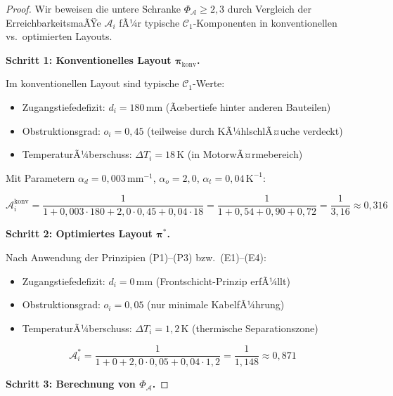 ﻿\documentclass[12pt,a4paper]{article}
\begin{document}
\begin{proof}
Wir beweisen die untere Schranke $\Phi_\mathcal{A} \geq 2{,}3$ durch Vergleich
der ErreichbarkeitsmaÃŸe $\mathcal{A}_i$ fÃ¼r typische $\mathcal{C}_1$-Komponenten
in konventionellen vs.\ optimierten Layouts.

\textbf{Schritt 1: Konventionelles Layout $\boldsymbol{\pi}_\mathrm{konv}$.}

Im konventionellen Layout sind typische $\mathcal{C}_1$-Werte:
\begin{itemize}[leftmargin=*]
	\item Zugangstiefedefizit: $d_i = 180\,\mathrm{mm}$ (Ãœbertiefe hinter anderen
	Bauteilen)
	\item Obstruktionsgrad: $o_i = 0{,}45$ (teilweise durch KÃ¼hlschlÃ¤uche verdeckt)
	\item TemperaturÃ¼berschuss: $\Delta T_i = 18\,\mathrm{K}$ (in MotorwÃ¤rmebereich)
\end{itemize}

Mit Parametern $\alpha_d = 0{,}003\,\mathrm{mm}^{-1}$,
$\alpha_o = 2{,}0$, $\alpha_t = 0{,}04\,\mathrm{K}^{-1}$:

\begin{equation}
	\mathcal{A}_i^\mathrm{konv} = \frac{1}{1 + 0{,}003 \cdot 180 + 2{,}0 \cdot 0{,}45
		+ 0{,}04 \cdot 18}
	= \frac{1}{1 + 0{,}54 + 0{,}90 + 0{,}72}
	= \frac{1}{3{,}16} \approx 0{,}316
	\label{eq:a_konv}
\end{equation}

\textbf{Schritt 2: Optimiertes Layout $\boldsymbol{\pi}^*$.}

Nach Anwendung der Prinzipien (P1)--(P3) bzw.\ (E1)--(E4):
\begin{itemize}[leftmargin=*]
	\item Zugangstiefedefizit: $d_i = 0\,\mathrm{mm}$ (Frontschicht-Prinzip erfÃ¼llt)
	\item Obstruktionsgrad: $o_i = 0{,}05$ (nur minimale KabelfÃ¼hrung)
	\item TemperaturÃ¼berschuss: $\Delta T_i = 1{,}2\,\mathrm{K}$ (thermische Separationszone)
\end{itemize}

\begin{equation}
	\mathcal{A}_i^* = \frac{1}{1 + 0 + 2{,}0 \cdot 0{,}05 + 0{,}04 \cdot 1{,}2}
	= \frac{1}{1{,}148} \approx 0{,}871
	\label{eq:a_opt}
\end{equation}

\textbf{Schritt 3: Berechnung von $\Phi_\mathcal{A}$.}


\end{proof}
\end{document}
